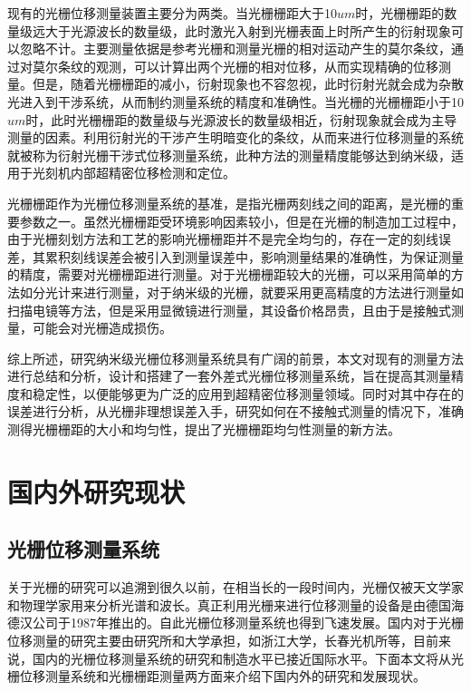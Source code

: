\documentclass[type=master,oneside]{fduthesis}
\begin{document}
现有的光栅位移测量装置主要分为两类。当光栅栅距大于10$um$时，光栅栅距的数量级远大于光源波长的数量级，此时激光入射到光栅表面上时所产生的衍射现象可以忽略不计。主要测量依据是参考光栅和测量光栅的相对运动产生的莫尔条纹，通过对莫尔条纹的观测，可以计算出两个光栅的相对位移，从而实现精确的位移测量。但是，随着光栅栅距的减小，衍射现象也不容忽视，此时衍射光就会成为杂散光进入到干涉系统，从而制约测量系统的精度和准确性。当光栅的光栅栅距小于10$um$时，此时光栅栅距的数量级与光源波长的数量级相近，衍射现象就会成为主导测量的因素。利用衍射光的干涉产生明暗变化的条纹，从而来进行位移测量的系统就被称为衍射光栅干涉式位移测量系统\cite{王雪英2014基于衍射干涉原理的高精度光栅位移测量系统研究}，此种方法的测量精度能够达到纳米级，适用于光刻机内部超精密位移检测和定位。

光栅栅距\cite{decker2009report}作为光栅位移测量系统的基准，是指光栅两刻线之间的距离，是光栅的重要参数之一。虽然光栅栅距受环境影响因素较小，但是在光栅的制造加工过程中，由于光栅刻划方法和工艺的影响\cite{李晓天2013机械刻划光栅刻线误差及其修正方法研究}光栅栅距并不是完全均匀的，存在一定的刻线误差，其累积刻线误差会被引入到测量误差中，影响测量结果的准确性，为保证测量的精度，需要对光栅栅距进行测量。对于光栅栅距较大的光栅，可以采用简单的方法如分光计来进行测量，对于纳米级的光栅，就要采用更高精度的方法进行测量如扫描电镜\cite{misumi2003uncertainty}等方法，但是采用显微镜进行测量，其设备价格昂贵，且由于是接触式测量，可能会对光栅造成损伤。

综上所述，研究纳米级光栅位移测量系统具有广阔的前景，本文对现有的测量方法进行总结和分析，设计和搭建了一套外差式光栅位移测量系统，旨在提高其测量精度和稳定性，以便能够更为广泛的应用到超精密位移测量领域。同时对其中存在的误差进行分析，从光栅非理想误差入手，研究如何在不接触式测量的情况下，准确测得光栅栅距的大小和均匀性，提出了光栅栅距均匀性测量的新方法。

\section{国内外研究现状}
\subsection{光栅位移测量系统}
关于光栅的研究可以追溯到很久以前，在相当长的一段时间内，光栅仅被天文学家和物理学家用来分析光谱和波长。真正利用光栅来进行位移测量的设备是由德国海德汉公司于1987年推出的。自此光栅位移测量系统也得到飞速发展。国内对于光栅位移测量的研究主要由研究所和大学承担，如浙江大学，长春光机所等，目前来说，国内的光栅位移测量系统的研究和制造水平已接近国际水平。下面本文将从光栅位移测量系统和光栅栅距测量两方面来介绍下国内外的研究和发展现状。
\end{document}

